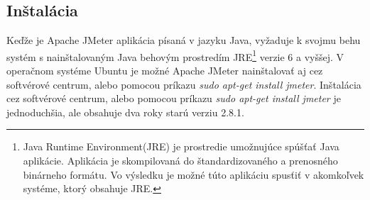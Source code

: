 \documentclass[12pt,oneside,final]{fithesis-utf8}
\begin{document}
\subsection{Inštalácia}
Keďže je Apache JMeter aplikácia písaná v jazyku Java, vyžaduje k svojmu behu systém s nainštalovaným Java behovým prostredím JRE\footnote{Java Runtime Environment(JRE) je prostredie umožnujúce spúšťať Java aplikácie. Aplikácia je skompilovaná do štandardizovaného a prenosného binárneho formátu. Vo výsledku je možné túto aplikáciu spusťiť v akomkoľvek systéme, ktorý obsahuje JRE.} verzie 6 a vyššej. V operačnom systéme Ubuntu je možné Apache JMeter nainštalovať aj cez softvérové centrum, alebo pomocou príkazu \textit{sudo apt-get install jmeter}. Inštalácia cez softvérové centrum, alebo pomocou príkazu \textit{sudo apt-get install jmeter} je jednoduchšia, ale obsahuje dva roky starú verziu 2.8.1.
\end{document}
